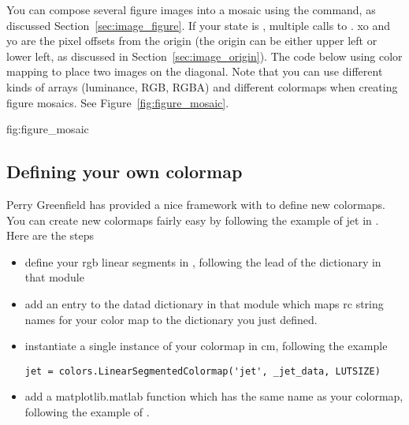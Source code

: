 \documentclass[]{book}
\begin{document}
You can compose several figure images into a mosaic using the
 command, as discussed Section~\ref{sec:image_figure}.  If
your  state is , multiple calls to
.  xo and yo are the pixel offsets from
the origin (the origin can be either upper left or lower left, as
discussed in Section~\ref{sec:image_origin}).  The code below using color
mapping to place two images on the diagonal.  Note that you can use
different kinds of arrays (luminance, RGB, RGBA) and different
colormaps when creating figure mosaics.  See
Figure~\ref{fig:figure_mosaic}.

{fig:figure_mosaic}




\subsection{Defining your own colormap}

Perry Greenfield has provided a nice framework with
 to define new
colormaps.  You can create new colormaps fairly easy by following the
example of jet in .  Here are the steps

\begin{itemize}
\item define your rgb linear segments in ,
  following the lead of the  dictionary in that module
  
\item add an entry to the datad dictionary in that module which maps
  rc string names for your color map to the dictionary you just
  defined.
  
\item instantiate a single instance of your colormap in cm, following
  the example 

\begin{lstlisting}
jet = colors.LinearSegmentedColormap('jet', _jet_data, LUTSIZE)
\end{lstlisting}

\item{add a matplotlib.matlab function which has the same name as your
    colormap, following the example of .}
\end{itemize}
\end{document}
